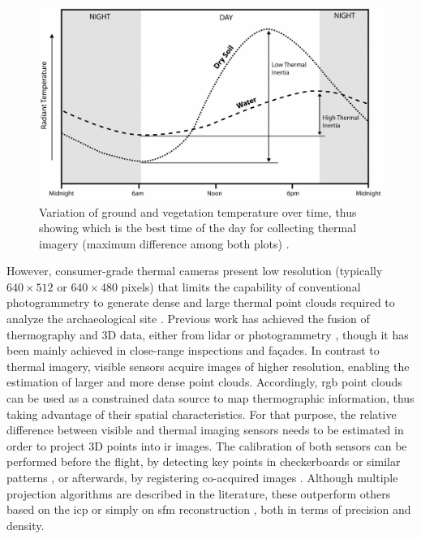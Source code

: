 \begin{figure}[ht]
    \centering
    \includegraphics[width=\linewidth]{figs/castle_puerta_arenas/thermal_exchanging_day.png}
	\caption{Variation of ground and vegetation temperature over time, thus showing which is the best time of the day for collecting thermal imagery (maximum difference among both plots) \cite{casana_archaeological_2017}.}
	\label{fig:thermal_exchanging}
\end{figure}

However, consumer-grade thermal cameras present low resolution (typically $640 \times 512$ or $640 \times 480$ pixels) that limits the capability of conventional photogrammetry to generate dense and large thermal point clouds required to analyze the archaeological site \cite{javadnejad_photogrammetric_2020}. Previous work has achieved the fusion of thermography and 3D data, either from \acrshort{lidar} or photogrammetry \cite{patrucco_3d_2022}, though it has been mainly achieved in close-range inspections and façades. In contrast to thermal imagery, visible sensors acquire images of higher resolution, enabling the estimation of larger and more dense point clouds. Accordingly, \acrshort{rgb} point clouds can be used as a constrained data source to map thermographic information, thus taking advantage of their spatial characteristics. For that purpose, the relative difference between visible and thermal imaging sensors needs to be estimated in order to project 3D points into \acrshort{ir} images. The calibration of both sensors can be performed before the flight, by detecting key points in checkerboards or similar patterns \cite{adan_towards_2020, javadnejad_photogrammetric_2020}, or afterwards, by registering co-acquired images \cite{javadnejad_photogrammetric_2020}. Although multiple projection algorithms are described in the literature, these outperform others based on the \acrshort{icp} \cite{webster_three-dimensional_2018} or simply on \acrshort{sfm} reconstruction \cite{gonzalez_thermal_2019, grechi_3d_2021}, both in terms of precision and density. 






